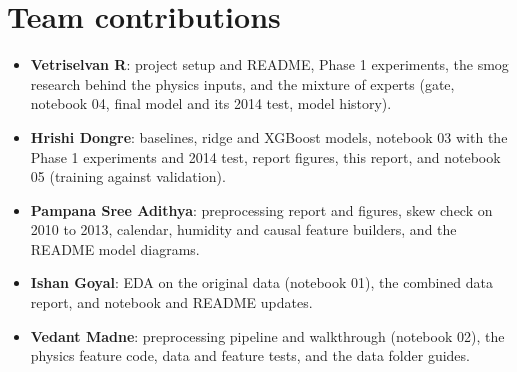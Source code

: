 \documentclass[conference]{IEEEtran}
\begin{document}
\section*{Team contributions}
\begin{itemize}
\item \textbf{Vetriselvan R}: project setup and README, Phase 1 experiments, the smog research behind the physics inputs, and the mixture of experts (gate, notebook 04, final model and its 2014 test, model history).
\item \textbf{Hrishi Dongre}: baselines, ridge and XGBoost models, notebook 03 with the Phase 1 experiments and 2014 test, report figures, this report, and notebook 05 (training against validation).
\item \textbf{Pampana Sree Adithya}: preprocessing report and figures, skew check on 2010 to 2013, calendar, humidity and causal feature builders, and the README model diagrams.
\item \textbf{Ishan Goyal}: EDA on the original data (notebook 01), the combined data report, and notebook and README updates.
\item \textbf{Vedant Madne}: preprocessing pipeline and walkthrough (notebook 02), the physics feature code, data and feature tests, and the data folder guides.
\end{itemize}
\end{document}
